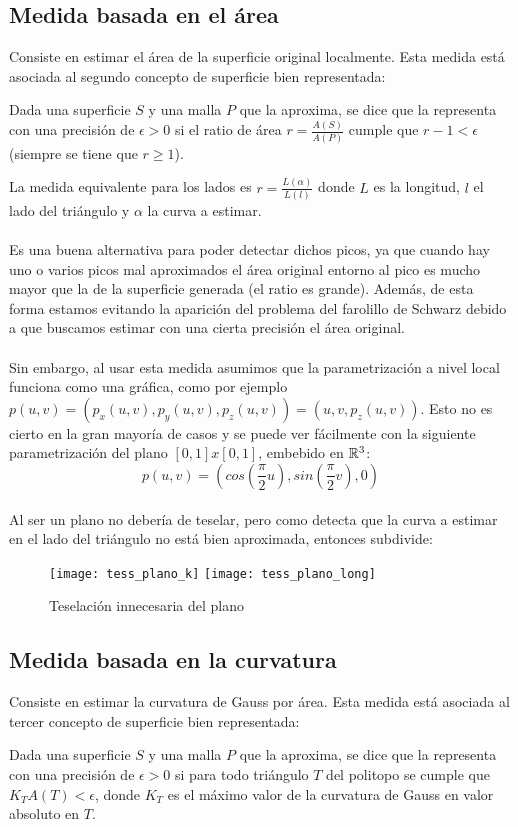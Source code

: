 	\subsection*{Medida basada en el área}
	
	Consiste en estimar el área de la superficie original localmente. Esta medida está asociada al segundo concepto de superficie bien representada:
	\begin{definicion}
		Dada una superficie $S$ y una malla $P$ que la aproxima, se dice que la representa con una precisión de $\epsilon > 0$ si el ratio de área $r=\frac{A(S)} {A(P)}$ cumple que $r-1 < \epsilon$ (siempre se tiene que $r\geq 1$).
	\end{definicion}
	
	La medida equivalente para los lados es $r=\frac{L(\alpha)} {L(l)}$ donde $L$ es la longitud, $l$ el lado del triángulo y $\alpha$ la curva a estimar.\\
	\\Es una buena alternativa para poder detectar dichos picos, ya que cuando hay uno o varios picos mal aproximados el área original entorno al pico es mucho mayor que la de la superficie generada (el ratio es grande). Además, de esta forma estamos evitando la aparición del problema del farolillo de Schwarz \cite{SchLantern} debido a que buscamos estimar con una cierta precisión el área original.\\
	\\Sin embargo, al usar esta medida asumimos que la parametrización a nivel local funciona como una gráfica, como por ejemplo $p(u,v)=(p_x(u,v),p_y(u,v),p_z(u,v)) = (u,v,p_z(u,v))$. Esto no es cierto en la gran mayoría de casos y se puede ver fácilmente con la siguiente parametrización del plano $[0,1]x[0,1]$, embebido en $\mathbb{R}^3$:
	$$p(u,v)=(cos(\frac{\pi}{2} u), sin(\frac{\pi}{2} v), 0 )$$
	\\Al ser un plano no debería de teselar, pero como detecta que la curva a estimar en el lado del triángulo no está bien aproximada, entonces subdivide:
	\begin{figure}[h]
  		\centering
  		\texttt{[image: tess\_plano\_k]}
  		\texttt{[image: tess\_plano\_long]}
  		\caption{Teselación innecesaria del plano}
  		\label{fig:plano_tess}
	\end{figure}
	
	\subsection*{Medida basada en la curvatura}
	Consiste en estimar la curvatura de Gauss por área. Esta medida está asociada al tercer concepto de superficie bien representada:
	\begin{definicion}
		Dada una superficie $S$ y una malla $P$ que la aproxima, se dice que la representa con una precisión de $\epsilon > 0$ si para todo triángulo $T$ del politopo se cumple que $K_T A(T) < \epsilon$, donde $K_T$ es el máximo valor de la curvatura de Gauss en valor absoluto en $T$.
	\end{definicion}
	

